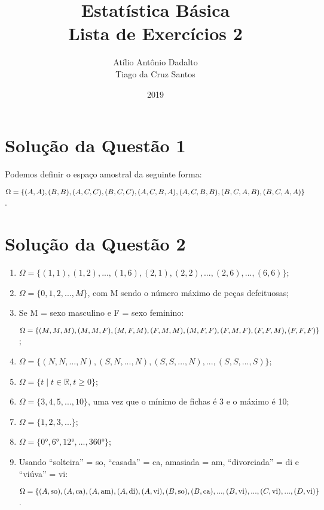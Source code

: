 \documentclass[
	12pt,				%
	openright,			%
	twoside,			%
	a4paper,			%
	english,			%
	french,				%
	spanish,			%
	brazil,				%
	]{abntex2}
\title{\blue Estatística Básica \\
\blueb Lista de Exercícios 2}
\author{Atílio Antônio Dadalto\\Tiago da Cruz Santos}
\date{2019}
\begin{document}
\frenchspacing

\textual

\maketitle
\textual
\newpage

\section{Solução da Questão 1}
Podemos definir o espaço amostral da seguinte forma:

$\Omega = \{(A, A), (B, B), (A, C, C), (B, C, C), (A, C, B, A),\\
(A, C, B, B), (B, C, A, B), (B, C, A, A)\}$.

\section{Solução da Questão 2}
\begin{enumerate}[label=\alph*)]
    \item $\Omega = \{(1, 1), (1, 2), ..., (1, 6), (2, 1), (2, 2), ..., (2, 6), ..., (6, 6)\}$;
    \item $\Omega = \{0, 1, 2, ..., M\}$, com M sendo o número máximo de peças defeituosas;
    \item Se M = sexo masculino e F = sexo feminino:
    
    $\Omega = \{(M, M, M), (M, M, F), (M, F, M), (F, M, M),\\(M, F, F), (F, M, F), (F, F, M), (F, F, F)\}$;
    \item $\Omega = \{(N, N, ..., N), (S, N, ..., N), (S, S, ..., N), ..., (S, S, ..., S)\}$;
    \item $\Omega = \{t \mid t \in \mathbb{R}, t \geq 0\}$;
    \item $\Omega = \{3, 4, 5, ..., 10\}$, uma vez que o mínimo de fichas é 3 e o máximo é 10;
    \item $\Omega = \{1, 2, 3, ...\}$;
    \item $\Omega = \{\ang{0}, \ang{6}, \ang{12}, ..., \ang{360}\}$;
    \item Usando ``solteira'' = so, ``casada'' = ca, amasiada = am, ``divorciada'' = di e ``viúva'' = vi:
    
    $\Omega = \{(A, \text{so}), (A, \text{ca}), (A, \text{am}), (A, \text{di}), (A, \text{vi}),\\(B, \text{so}), (B, \text{ca}), ..., (B, \text{vi}), ..., (C, \text{vi}), ..., (D, \text{vi})\}$.
\end{enumerate}
\end{document}
